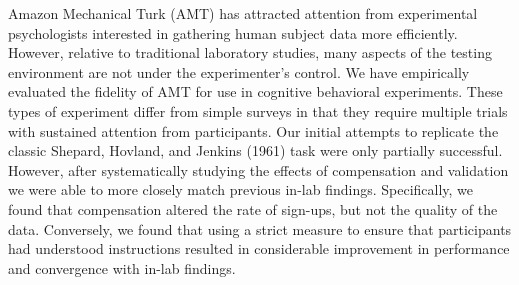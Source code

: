 \documentclass[10pt,letterpaper]{article}
\begin{document}
Amazon Mechanical Turk (AMT) has attracted attention from experimental
psychologists interested in gathering human subject data more efficiently.
However, relative to traditional laboratory studies, many aspects of the testing
environment are not under the experimenter's control. We have empirically
evaluated the fidelity of AMT for use in cognitive behavioral experiments. These
types of experiment differ from simple surveys in that they require multiple
trials with sustained attention from participants.  Our initial attempts to
replicate the classic Shepard, Hovland, and Jenkins (1961) task were only
partially successful. However, after systematically studying the effects of
compensation and validation we were able to more closely match previous in-lab
findings. Specifically, we found that compensation altered the rate of sign-ups,
but not the quality of the data. Conversely, we found that using a strict measure
to ensure that participants had understood instructions resulted in considerable
improvement in performance and convergence with in-lab findings.
\nocite{Shepard:1961wo}






\setlength{\bibleftmargin}{.125in}
\setlength{\bibindent}{-\bibleftmargin}


\end{document}
